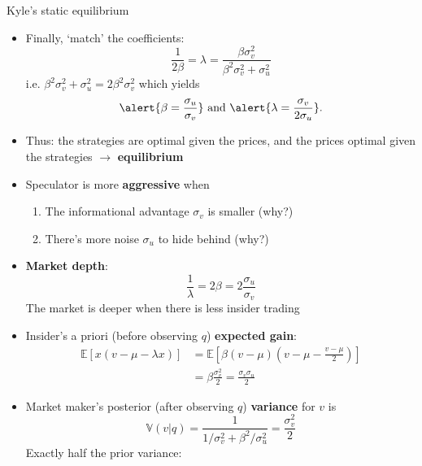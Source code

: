 \documentclass[english,10pt]{beamer}
\begin{document}
\begin{frame}{Kyle's static equilibrium}
	\begin{itemize}
		\item Finally, `match' the coefficients:
		\[
		\frac{1}{2\beta}=\lambda = \frac{\beta \sigma^2_v}{\beta^2 \sigma^2_v + \sigma^2_u}
		\]
		i.e. $\beta^2 \sigma^2_v + \sigma^2_u = 2 \beta^2 \sigma^2_v$ which yields
		\[
		\alert{ \beta = \frac{\sigma_u}{\sigma_v}}\text{ and } \alert{ \lambda = \frac{\sigma_v}{2\sigma_u}}.
		\]
		\item Thus: the strategies are optimal given the prices, and the prices optimal given the strategies $\rightarrow $ \textbf{equilibrium}
		\item Speculator is more \textbf{aggressive} when 
		\begin{enumerate}
			\item The informational advantage $\sigma_v$ is smaller (why?)
			\item There's more noise $\sigma_u$ to hide behind (why?)
		\end{enumerate}
	\end{itemize}
\end{frame}


\begin{frame}{}
	\begin{itemize}
		\item \textbf{Market depth}:
		\[
		\frac{1}{\lambda} = 2\beta = 2 \frac{\sigma_u}{\sigma_v}
		\]
		The market is deeper when there is less insider trading
		\item Insider's a priori (before observing $q$) \textbf{expected gain}:
		\begin{align*}
		\mathbb{E}[x(v-\mu-\lambda x)] 
		& =\mathbb{E}[\beta(v-\mu)\left(v-\mu-\frac{v-\mu}{2}\right)] \\
		&=\beta\frac{ \sigma^2_v}{2}=\frac{\sigma_v \sigma_u}{2}
		\end{align*}
		\item Market maker's posterior (after observing $q$) \textbf{variance} for $v$ is
		\[
		\mathbb{V}(v|q) = \frac{1}{1/\sigma^2_v + \beta^2/\sigma^2_u} = \frac{\sigma^2_v}{2}
		\]
		Exactly half the prior variance: 
	\end{itemize}
\end{frame}
\end{document}
